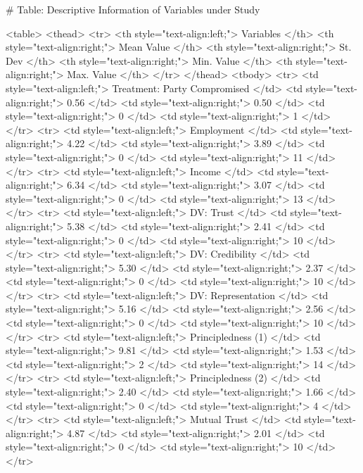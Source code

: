 # Table: Descriptive Information of Variables under Study 

<table>
 <thead>
  <tr>
   <th style="text-align:left;"> Variables </th>
   <th style="text-align:right;"> Mean Value </th>
   <th style="text-align:right;"> St. Dev </th>
   <th style="text-align:right;"> Min. Value </th>
   <th style="text-align:right;"> Max. Value </th>
  </tr>
 </thead>
<tbody>
  <tr>
   <td style="text-align:left;"> Treatment: Party Compromised </td>
   <td style="text-align:right;"> 0.56 </td>
   <td style="text-align:right;"> 0.50 </td>
   <td style="text-align:right;"> 0 </td>
   <td style="text-align:right;"> 1 </td>
  </tr>
  <tr>
   <td style="text-align:left;"> Employment </td>
   <td style="text-align:right;"> 4.22 </td>
   <td style="text-align:right;"> 3.89 </td>
   <td style="text-align:right;"> 0 </td>
   <td style="text-align:right;"> 11 </td>
  </tr>
  <tr>
   <td style="text-align:left;"> Income </td>
   <td style="text-align:right;"> 6.34 </td>
   <td style="text-align:right;"> 3.07 </td>
   <td style="text-align:right;"> 0 </td>
   <td style="text-align:right;"> 13 </td>
  </tr>
  <tr>
   <td style="text-align:left;"> DV: Trust </td>
   <td style="text-align:right;"> 5.38 </td>
   <td style="text-align:right;"> 2.41 </td>
   <td style="text-align:right;"> 0 </td>
   <td style="text-align:right;"> 10 </td>
  </tr>
  <tr>
   <td style="text-align:left;"> DV: Credibility </td>
   <td style="text-align:right;"> 5.30 </td>
   <td style="text-align:right;"> 2.37 </td>
   <td style="text-align:right;"> 0 </td>
   <td style="text-align:right;"> 10 </td>
  </tr>
  <tr>
   <td style="text-align:left;"> DV: Representation </td>
   <td style="text-align:right;"> 5.16 </td>
   <td style="text-align:right;"> 2.56 </td>
   <td style="text-align:right;"> 0 </td>
   <td style="text-align:right;"> 10 </td>
  </tr>
  <tr>
   <td style="text-align:left;"> Principledness (1) </td>
   <td style="text-align:right;"> 9.81 </td>
   <td style="text-align:right;"> 1.53 </td>
   <td style="text-align:right;"> 2 </td>
   <td style="text-align:right;"> 14 </td>
  </tr>
  <tr>
   <td style="text-align:left;"> Principledness (2) </td>
   <td style="text-align:right;"> 2.40 </td>
   <td style="text-align:right;"> 1.66 </td>
   <td style="text-align:right;"> 0 </td>
   <td style="text-align:right;"> 4 </td>
  </tr>
  <tr>
   <td style="text-align:left;"> Mutual Trust </td>
   <td style="text-align:right;"> 4.87 </td>
   <td style="text-align:right;"> 2.01 </td>
   <td style="text-align:right;"> 0 </td>
   <td style="text-align:right;"> 10 </td>
  </tr>
